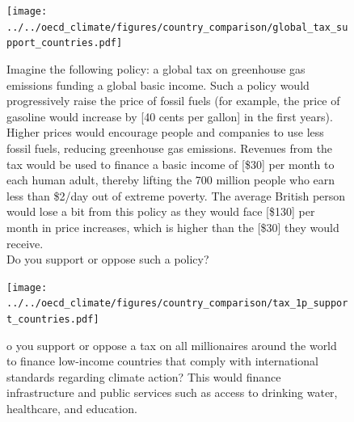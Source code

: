 \begin{framefont}{\small}
\begin{frame}{}
	\begin{figure}[h!]
	\centering \vspace{-.3cm}
	\caption{\scriptsize Imagine the following policy: a global tax on greenhouse gas emissions funding a global basic income. 
	Such a policy would progressively raise the price of fossil fuels (for example, the price of gasoline would increase by [40 cents per gallon] in the first years). Higher prices would encourage people and companies to use less fossil fuels, reducing greenhouse gas emissions. Revenues from the tax would be used to finance a basic income of [\$30] per month to each human adult, thereby lifting the 700 million people who earn less than \$2/day out of extreme poverty. 
	The average British person would lose a bit from this policy as they would face [\$130] per month in price increases, which is higher than the [\$30] they would receive.
	\\
	Do you support or oppose such a policy?   \hyperlink{global_policies}{}
	}
	\texttt{[image: ../../oecd\_climate/figures/country\_comparison/global\_tax\_support\_countries.pdf]}
	\end{figure}
\end{frame}

\begin{frame}{}
	\begin{figure}[h!]
	\centering
	\caption{\scriptsize o you support or oppose a tax on all millionaires around the world to finance low-income countries that comply with international standards regarding climate action? 
	This would finance infrastructure and public services such as access to drinking water, healthcare, and education.  \hyperlink{global_policies}{}
	}
	\texttt{[image: ../../oecd\_climate/figures/country\_comparison/tax\_1p\_support\_countries.pdf]}
	\end{figure}
\end{frame}
	

\end{framefont}
